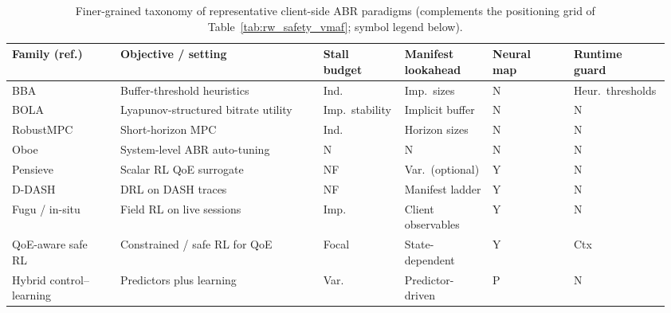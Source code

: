 \documentclass[preprint,12pt,times]{elsarticle}
\newcommand{\tablebodyfont}{\small}
\newcommand{\evaltable}[1]{%
  \begingroup\tablebodyfont
  \renewcommand{\arraystretch}{1.12}%
  \setlength{\tabcolsep}{4pt}%
  #1%
  \endgroup
}
\begin{document}
\begin{table}[H]
    \caption{Finer-grained taxonomy of representative client-side ABR paradigms (complements the positioning grid of Table~\ref{tab:rw_safety_vmaf}; symbol legend below).}
    \label{tab:comparison}
    \centering
    \evaltable{%
    \begin{tabularx}{\linewidth}{@{}%
        >{\raggedright\arraybackslash}p{0.16\linewidth}
        >{\raggedright\arraybackslash}p{0.30\linewidth}
        >{\centering\arraybackslash}p{0.12\linewidth}
        >{\centering\arraybackslash}p{0.12\linewidth}
        >{\centering\arraybackslash}p{0.12\linewidth}
        >{\centering\arraybackslash}p{0.14\linewidth}@{}}
    \toprule
    \textbf{Family (ref.)}
        & \textbf{Objective / setting}
        & \makecell{\textbf{Stall}\\\textbf{budget}}
        & \makecell{\textbf{Manifest}\\\textbf{lookahead}}
        & \makecell{\textbf{Neural}\\\textbf{map}}
        & \makecell{\textbf{Runtime}\\\textbf{guard}} \\
    \midrule
    BBA~\cite{huang2014buffer}
        & Buffer-threshold heuristics
        & Ind.\ & Imp.\ sizes & N & Heur.\ thresholds \\
    BOLA~\cite{spiteri2018bola}
        & Lyapunov-structured bitrate utility
        & Imp.\ stability & Implicit buffer & N & N \\
    RobustMPC~\cite{yin2015control}
        & Short-horizon MPC
        & Ind.\ & Horizon sizes & N & N \\
    Oboe~\cite{akhtar2018oboe}
        & System-level ABR auto-tuning
        & N & N & N & N \\
    Pensieve~\cite{mao2017neural}
        & Scalar RL QoE surrogate
        & NF & Var.\ (optional) & Y & N \\
    D-DASH~\cite{gadaleta2017ddash}
        & DRL on DASH traces
        & NF & Manifest ladder & Y & N \\
    Fugu / in-situ~\cite{yan2019learning}
        & Field RL on live sessions
        & Imp.\ & Client observables & Y & N \\
    QoE-aware safe RL~\cite{xiao2025qoe}
        & Constrained / safe RL for QoE
        & Focal & State-dependent & Y & Ctx \\
    Hybrid control--learning~\cite{liu2023hybrid}
        & Predictors plus learning
        & Var.\ & Predictor-driven & P & N \\

\end{tabularx}}
\end{table}
\end{document}
